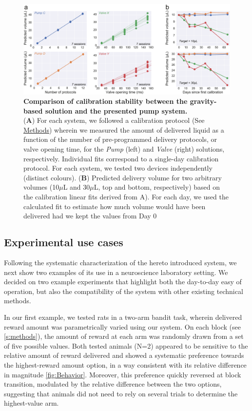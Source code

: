 \begin{figure} 
	\centering
	\includegraphics[width=1.0\linewidth]{Figures/Artboard 2.pdf}
	\caption{\textbf{Comparison of calibration stability between the gravity-based solution and the presented pump system.}\\
		(\textbf{A}) For each system, we followed a calibration protocol (See \hyperref[s:methods]{Methods}) wherein we measured the amount of delivered liquid as a function of the number of pre-programmed delivery protocols, or valve opening time, for the \textit{Pump} (left) and \textit{Valve} (right) solutions, respectively. Individual fits correspond to a single-day calibration protocol. For each system, we tested two devices independently (distinct colours). (\textbf{B}) Predicted delivery volume for two arbitrary volumes (10$\mu$L and 30$\mu$L, top and bottom, respectively) based on the calibration linear fits derived from A). For each day, we used the calculated fit to estimate how much volume would have been delivered had we kept the values from Day 0}
	\label{fig:PumpVsValve} 
\end{figure}


\subsection*{Experimental use cases}

Following the systematic characterization of the hereto introduced system, we next show two examples of its use in a neuroscience laboratory setting. We decided on two example experiments that highlight both the day-to-day easy of operation, but also the compatibility of the system with other existing technical methods.

In our first example, we tested rats in a two-arm bandit task, wherein delivered reward amount was parametrically varied using our system. On each block (see \ref{s:methods}), the amount of reward at each arm was randomly drawn from a set of five possible values. Both tested animals (N=2) appeared to be sensitive to the relative amount of reward delivered and showed a systematic preference towards the highest-reward amount option, in a way consistent with its relative difference in magnitude \ref{fig:Behavior}. Moreover, this preference quickly reversed at block transition, modulated by the relative difference between the two options, suggesting that animals did not need to rely on several trials to determine the highest-value arm.

